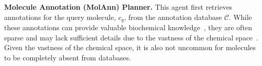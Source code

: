 



\noindent \textbf{Molecule Annotation (MolAnn) Planner.}
This agent first retrieves annotations for the query molecule, $c_q$, from the annotation database $\mathcal{C}$. While these annotations can provide valuable biochemical knowledge~\cite{yu2024llasmol}, they are often sparse and may lack sufficient details due to the vastness of the chemical space~\cite{lee2024vision}.
Given the vastness of the chemical space, it is also not uncommon for molecules to be completely absent from databases.

